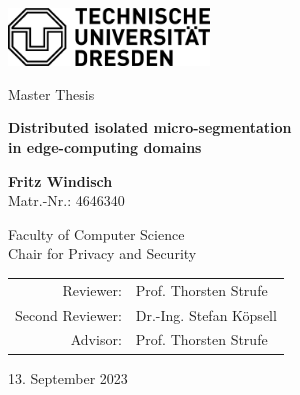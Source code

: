 \begin{titlepage}
    \begin{flushright}
        \includegraphics[width=0.4\textwidth]{images/title/tud.png}
    \end{flushright}
    \begin{center}
        \vspace*{2.5cm}

        Master Thesis

        \vspace{1cm}

        \textbf{\LARGE Distributed isolated micro-segmentation\\in edge-computing domains}

        \vspace{1.5cm}

        \textbf{\large Fritz Windisch}\\
        Matr.-Nr.: 4646340

        \vspace{1cm}

        Faculty of Computer Science\\
        Chair for Privacy and Security

        \vfill

        \begin{tabular}{rl}
               Reviewer: & Prof. Thorsten Strufe \\
               Second Reviewer: & Dr.-Ing. Stefan Köpsell \\
               Advisor: & Prof. Thorsten Strufe \\
        \end{tabular}

        \vspace{0.8cm}

        13. September 2023

   \end{center}
\end{titlepage}